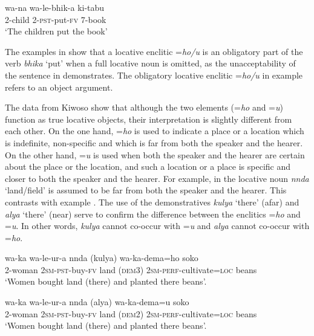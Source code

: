 \documentclass[output=paper]{langscibook}
\begin{document}
    \ex\label{ex:mallya:19c}
    \gll wa-na   wa-le-bhik-a     ki-tabu\\
     2-child  2-\textsc{pst}-put-\textsc{fv}    7-book    \\
    \glt ‘The children put the book’
    \z
\z

The examples in  show that a locative enclitic =\textit{ho/u} is an obligatory part of the verb \textit{bhika} ‘put’ when a full locative noun is omitted, as the unacceptability of the sentence in  demonstrates. The obligatory locative enclitic =\textit{ho/u} in example  refers to an object argument.

The data from Kiwoso show that although the two elements (=\textit{ho} and =\textit{u}) function as true locative objects, their interpretation is slightly different from each other. On the one hand, =\textit{ho} is used to indicate a place or a location which is indefinite, non-specific and which is far from both the speaker and the hearer. On the other hand, =\textit{u} is used when both the speaker and the hearer are certain about the place or the location, and such a location or a place is specific and closer to both the speaker and the hearer. For example, in  the locative noun \textit{nnda} ‘land/field’ is assumed to be far from both the speaker and the hearer. This contrasts with example . The use of the demonstratives \textit{kulya} ‘there’ (afar) and \textit{alya} ‘there’ (near) serve to confirm the difference between the enclitics =\textit{ho} and =\textit{u}. In other words, \textit{kulya} cannot co-occur with =\textit{u} and \textit{alya} cannot co-occur with =\textit{ho}. 

\ea%
    \label{ex:mallya:20}
    \ea\label{ex:mallya:20a}
    \gll wa-ka       wa-le-ur-a     nnda   (kulya)   wa-ka-dema=ho             soko\\
    2-woman 2\textsc{sm}-\textsc{pst}-buy-\textsc{fv} land        (\textsc{dem}3)  2\textsc{sm}-\textsc{perf}-cultivate=\textsc{loc}   beans\\
    \glt  ‘Women bought land (there) and planted there beans’.

    \ex\label{ex:mallya:20b}
    \gll wa-ka       wa-le-ur-a     nnda   (alya)     wa-ka-dema=u           soko\\
        2-woman 2\textsc{sm}-\textsc{pst}-buy-\textsc{fv} land      (\textsc{dem}2)  2\textsc{sm}-\textsc{perf}-cultivate=\textsc{loc}   beans\\
    \glt  ‘Women bought land (there) and planted there beans’.
    \z
\z
\end{document}

